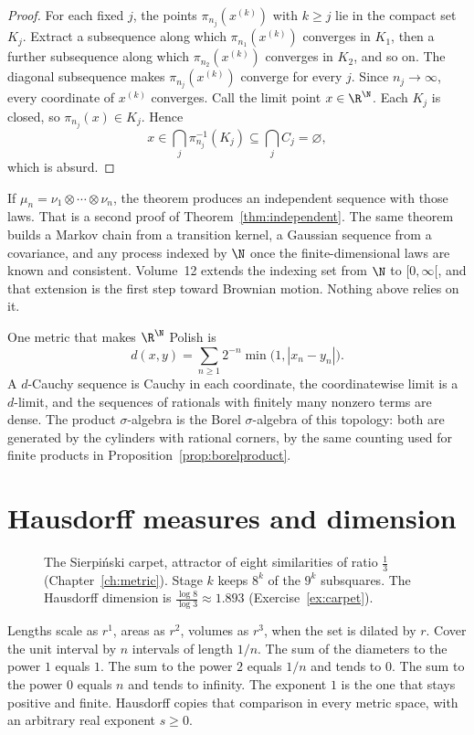 \begin{proof}
For each fixed $j$, the points $\pi_{n_j}(x^{(k)})$ with $k\ge j$ lie in the compact set $K_j$. Extract a subsequence along which
$\pi_{n_1}(x^{(k)})$ converges in $K_1$, then a further subsequence along which $\pi_{n_2}(x^{(k)})$ converges in $K_2$, and so on. The
diagonal subsequence makes $\pi_{n_j}(x^{(k)})$ converge for every $j$. Since $n_j\to\infty$, every coordinate of $x^{(k)}$ converges. Call
the limit point $x\in\R^\N$. Each $K_j$ is closed, so $\pi_{n_j}(x)\in K_j$. Hence
\[x\in\bigcap_j\pi_{n_j}^{-1}(K_j)\subseteq\bigcap_j C_j=\varnothing,\]
which is absurd.
\end{proof}

If $\mu_n=\nu_1\otimes\cdots\otimes\nu_n$, the theorem produces an independent sequence with those laws. That is a second proof of
Theorem~\ref{thm:independent}. The same theorem builds a Markov chain from a transition kernel, a Gaussian sequence from a covariance, and
any process indexed by $\N$ once the finite-dimensional laws are known and consistent. Volume~12 extends the indexing set from $\N$ to
$[0,\infty[$, and that extension is the first step toward Brownian motion. Nothing above relies on it.

One metric that makes $\R^\N$ Polish is
\[d(x,y)=\sum_{n\ge 1}2^{-n}\min\bigl(1,|x_n-y_n|\bigr).\]
A $d$-Cauchy sequence is Cauchy in each coordinate, the coordinatewise limit is a $d$-limit, and the sequences of rationals with finitely many
nonzero terms are dense. The product $\sigma$-algebra is the Borel $\sigma$-algebra of this topology: both are generated by the cylinders with
rational corners, by the same counting used for finite products in Proposition~\ref{prop:borelproduct}.

\section{Hausdorff measures and dimension}

\begin{figure}[ht]
\centering
{}
\caption{The Sierpi\'nski carpet, attractor of eight similarities of ratio $\frac13$ (Chapter~\ref{ch:metric}). Stage $k$ keeps $8^k$ of the
$9^k$ subsquares. The Hausdorff dimension is $\frac{\log 8}{\log 3}\approx 1.893$ (Exercise~\ref{ex:carpet}).}
\label{fig:carpet}
\end{figure}

Lengths scale as $r^1$, areas as $r^2$, volumes as $r^3$, when the set is dilated by $r$. Cover the unit interval by $n$ intervals of length
$1/n$. The sum of the diameters to the power $1$ equals $1$. The sum to the power $2$ equals $1/n$ and tends to $0$. The sum to the power $0$
equals $n$ and tends to infinity. The exponent $1$ is the one that stays positive and finite. Hausdorff copies that comparison in every
metric space, with an arbitrary real exponent $s\ge 0$.

